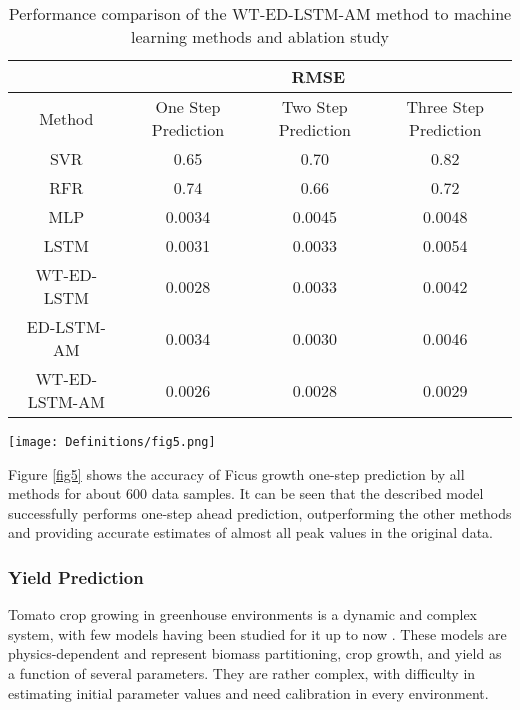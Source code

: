 \documentclass[journal,article,accept,moreauthors,pdftex]{Definitions/mdpi}
\begin{document}
\begin{table}[t!]
\caption{Performance comparison of the WT-ED-LSTM-AM method to machine learning methods and ablation study}
\label{table:ficus_Accuracy}
\centering
\begin{tabular}{|c|c|c|c|}
\hline 
& \multicolumn{3}{c}{RMSE}\\
\hline
Method & One Step Prediction & Two Step Prediction & Three Step Prediction \\
\hline \hline
SVR & 0.65 & 0.70 & 0.82\\
RFR & 0.74 & 0.66 & 0.72\\
MLP & 0.0034 & 0.0045 & 0.0048\\
LSTM & 0.0031 & 0.0033 & 0.0054\\
WT-ED-LSTM & 0.0028 & 0.0033 & 0.0042\\
ED-LSTM-AM & 0.0034 & 0.0030 & 0.0046\\
WT-ED-LSTM-AM & 0.0026 & 0.0028 & 0.0029\\
\hline 
\end{tabular}
\end{table}



\begin{figure*}[tph!]
\texttt{[image: Definitions/fig5.png]}
\centering
\caption{Performance comparison in one-step prediction (described and standard ML methods).}
\label{fig5}
\end{figure*}

Figure \ref{fig5} shows the accuracy of Ficus growth one-step prediction by all methods
for about 600 data samples. It can be seen that the described model successfully
performs one-step ahead prediction, outperforming the other methods
and providing accurate estimates of almost all peak values in the original data.


\subsubsection{Yield Prediction}

Tomato crop growing in greenhouse environments is  a dynamic and complex system, with few models having been studied for it up to now \cite{ref27, ref28}. These models  are physics-dependent and represent biomass partitioning, crop growth, and yield as a function of several parameters. They are rather complex, with difficulty in estimating initial parameter values and  need calibration in every environment. 
\end{document}
